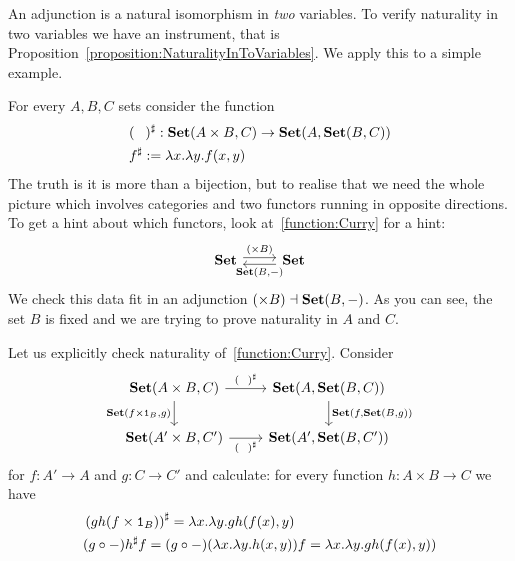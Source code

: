 An adjunction is a natural isomorphism in {\em two} variables. To verify
naturality in two variables we have an instrument, that is
Proposition~\ref{proposition:NaturalityInToVariables}. We apply this to
a simple example.


\begin{example}[Currying]\label{example:CurryingFunctions}
  For every \(A, B, C\) sets consider the function
  \begin{equation}
    \begin{aligned}
      & (\hole)^\sharp : \Set(A \times B, C) \to \Set(A, \Set(B, C)) \\
      & f^\sharp := \lambda x. \lambda y. f(x, y)
    \end{aligned}
    \label{function:Curry}
  \end{equation}
  The truth is it is more than a bijection, but to realise that we need
  the whole picture which involves categories and two functors running
  in opposite directions. To get a hint about which functors, look
  at~\eqref{function:Curry} for a hint:
  \[
    \begin{tikzcd}
      \Set \ar["{(\times B)}", r, shift left] & \Set \ar["{\Set(B, -)}", l,
      shift left]
    \end{tikzcd}
  \]
  We check this data fit in an adjunction
  \((\times B) \dashv \mathbf{Set}(B, -)\). As you can see, the set \(B\) is fixed and we
  are trying to prove naturality in \(A\) and \(C\).

  Let us explicitly check naturality of~\eqref{function:Curry}. Consider
  \[
    \begin{tikzcd}
      \Set(A \times B, C) \ar["{\Set(f \times \id_B, g)}", d, swap]
      \ar["{(\hole)^\sharp}",
      r] & \Set(A, \Set(B, C)) \ar["{\Set(f, \Set(B, g))}", d] \\
      \Set(A' \times B, C') \ar["{(\hole)^\sharp}", r, swap] & \Set(A', \Set(B,
      C'))
    \end{tikzcd}
  \]
  for \(f : A' \to A\) and \(g : C \to C'\) and calculate: for every
  function \(h : A \times B \to C\) we have
  \begin{align*}
    & \left(g h (f \times \mathtt 1_B) \right)^\sharp = \lambda x. \lambda y. gh(f(x), y) \\
    & (g \circ -) h^\sharp f = (g \circ -) (\lambda x. \lambda y. h(x, y)) f = \lambda x. \lambda y. gh(f(x), y))
  \end{align*}
\end{example}

